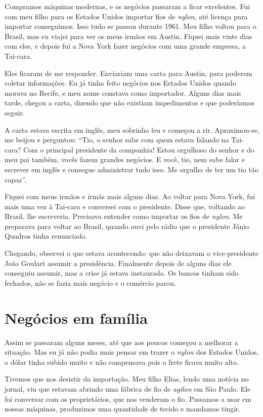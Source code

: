 Compramos máquinas modernas, e os negócios passaram a ficar excelentes. Fui com
meu filho para os Estados Unidos importar fios de \textit{nylon}, até
licença para importar conseguimos. Isso tudo se passou durante 1961. 
Meu filho voltou para o Brasil, mas eu viajei para ver os
meus irmãos em Austin. Fiquei mais vinte dias com eles, e depois fui a
Nova York fazer negócios com uma grande empresa, a Tai-cara.

Eles ficaram de me responder. Enviariam uma carta para Austin, para poderem 
coletar informações. Eu já tinha feito negócios nos Estados
Unidos quando morava no Recife, e meu nome constava como importador.
Alguns dias mais tarde, chegou a carta, dizendo que não
existiam impedimentos e que poderíamos seguir. 

A carta estava
escrita em inglês, meu sobrinho leu e começou a rir. Aproximou-se, me
beijou e perguntou: ``Tio, o senhor sabe com quem estava falando na Tai-cara? Com
o principal presidente da companhia! Estou orgulhoso do senhor e do
meu pai também, vocês fazem grandes negócios. E você, tio, nem sabe
falar e escrever em inglês e consegue administrar tudo isso. Me orgulho
de ter um tio tão capaz''.

Fiquei com meus irmãos e irmãs mais alguns dias. Ao voltar para Nova York, 
fui mais uma vez à Tai-cara e conversei com o presidente. Disse que,  
voltando ao Brasil, lhe escreveria. Precisava entender como importar os fios de \textit{nylon}. Me preparava para voltar ao Brasil, quando ouvi pelo rádio que o presidente Jânio
Quadros tinha renunciado.

Chegando, observei o que estava acontecendo: que não
deixavam o vice-presidente João Goulart assumir a presidência. 
Finalmente depois de alguns dias ele conseguiu assumir, mas a crise já estava instaurada. Os bancos tinham sido fechados, não se fazia mais negócio e o comércio parou.

\chapter{Negócios em família}

Assim se passaram alguns meses, até que aos poucos começou a melhorar a
situação. Mas eu já não podia mais pensar em trazer o \textit{nylon} dos Estados
Unidos, o dólar tinha subido muito e não compensava pois o frete 
ficava muito alto.

Tivemos que nos desistir da importação. Meu filho Elias, lendo uma
notícia no jornal, viu que estavam abrindo uma fábrica de fio
de \textit{agilon} em São Paulo. Ele foi conversar com os proprietários, que nos venderam o fio. Passamos a usar em nossas máquinas, produzimos uma
quantidade de tecido e mandamos tingir.

